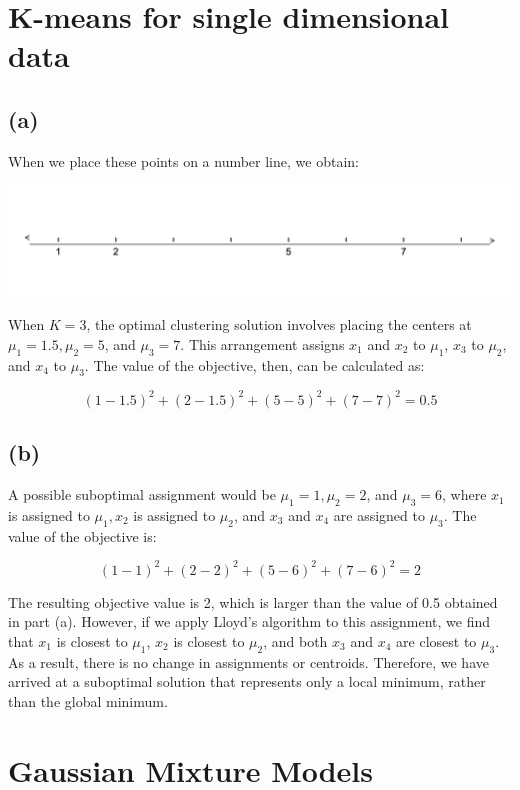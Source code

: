 \documentclass[11pt]{article}
\newcommand{\sol}[1]{{\bf{\color{magenta}{{Solution:}}}}}
\begin{document}
\section{K-means for single dimensional data }

\subsection{(a)}
\sol x When we place these points on a number line, we obtain:

\begin{center}
    \includegraphics[scale=0.5]{2a.png}
\end{center}

When $K=3$, the optimal clustering solution involves placing the centers at $\mu_{1}=1.5, \mu_{2}=5$, and $\mu_{3}=7$. This arrangement assigns $x_{1}$ and $x_{2}$ to $\mu_{1}$, $x_{3}$ to $\mu_{2}$, and $x_{4}$ to $\mu_{3}$. The value of the objective, then, can be calculated as:

$$
(1-1.5)^{2}+(2-1.5)^{2}+(5-5)^{2}+(7-7)^{2}=0.5
$$

\subsection{(b)}
\sol x A possible suboptimal assignment would be $\mu_{1}=1, \mu_{2}=2$, and $\mu_{3}=6$, where $x_{1}$ is assigned to $\mu_{1}, x_{2}$ is assigned to $\mu_{2}$, and $x_{3}$ and $x_{4}$ are assigned to $\mu_{3}$. The value of the objective is:

$$
(1-1)^{2}+(2-2)^{2}+(5-6)^{2}+(7-6)^{2}=2
$$

The resulting objective value is 2, which is larger than the value of 0.5 obtained in part (a). However, if we apply Lloyd's algorithm to this assignment, we find that $x_{1}$ is closest to $\mu_{1}$, $x_{2}$ is closest to $\mu_{2}$, and both $x_{3}$ and $x_{4}$ are closest to $\mu_{3}$. As a result, there is no change in assignments or centroids. Therefore, we have arrived at a suboptimal solution that represents only a local minimum, rather than the global minimum.

\section{Gaussian Mixture Models}
\end{document}
